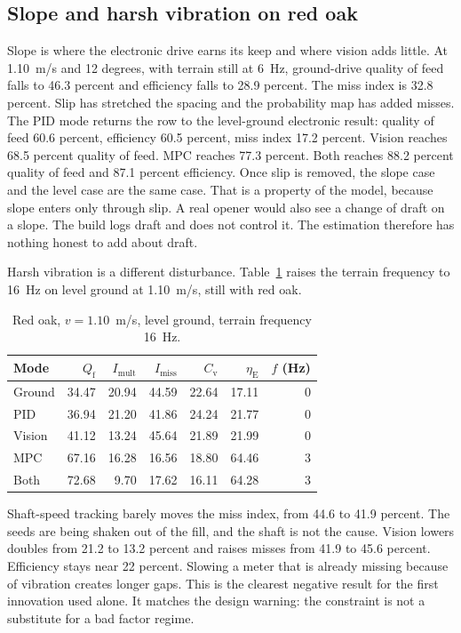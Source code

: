 \subsection{Slope and harsh vibration on red oak}

Slope is where the electronic drive earns its keep and where vision adds little. At 1.10~m/s and 12 degrees, with terrain still at 6~Hz, ground-drive quality of feed falls to 46.3 percent and efficiency falls to 28.9 percent. The miss index is 32.8 percent. Slip has stretched the spacing and the probability map has added misses. The PID mode returns the row to the level-ground electronic result: quality of feed 60.6 percent, efficiency 60.5 percent, miss index 17.2 percent. Vision reaches 68.5 percent quality of feed. MPC reaches 77.3 percent. Both reaches 88.2 percent quality of feed and 87.1 percent efficiency. Once slip is removed, the slope case and the level case are the same case. That is a property of the model, because slope enters only through slip. A real opener would also see a change of draft on a slope. The build logs draft and does not control it. The estimation therefore has nothing honest to add about draft.

Harsh vibration is a different disturbance. Table~\ref{tab:harsh} raises the terrain frequency to 16~Hz on level ground at 1.10~m/s, still with red oak.

\begin{table}[htbp]
\centering
\caption{Red oak, $v=1.10$~m/s, level ground, terrain frequency 16~Hz.}
\label{tab:harsh}
\begin{tabular}{@{}lrrrrrr@{}}
\toprule
Mode & $Q_{\mathrm{f}}$ & $I_{\mathrm{mult}}$ & $I_{\mathrm{miss}}$ & $C_{\mathrm{v}}$ & $\eta_{\mathrm{E}}$ & $f$ (Hz) \\
\midrule
Ground & 34.47 & 20.94 & 44.59 & 22.64 & 17.11 & 0 \\
PID & 36.94 & 21.20 & 41.86 & 24.24 & 21.77 & 0 \\
Vision & 41.12 & 13.24 & 45.64 & 21.89 & 21.99 & 0 \\
MPC & 67.16 & 16.28 & 16.56 & 18.80 & 64.46 & 3 \\
Both & 72.68 & 9.70 & 17.62 & 16.11 & 64.28 & 3 \\
\bottomrule
\end{tabular}
\end{table}

Shaft-speed tracking barely moves the miss index, from 44.6 to 41.9 percent. The seeds are being shaken out of the fill, and the shaft is not the cause. Vision lowers doubles from 21.2 to 13.2 percent and raises misses from 41.9 to 45.6 percent. Efficiency stays near 22 percent. Slowing a meter that is already missing because of vibration creates longer gaps. This is the clearest negative result for the first innovation used alone. It matches the design warning: the constraint is not a substitute for a bad factor regime.

